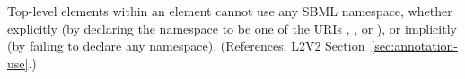 Top-level elements within an  element cannot use any SBML
namespace, whether explicitly (by declaring the namespace to be one of the
URIs ,
, or
), or implicitly (by failing
to declare any namespace).  (References: L2V2
Section~\ref{sec:annotation-use}.)

